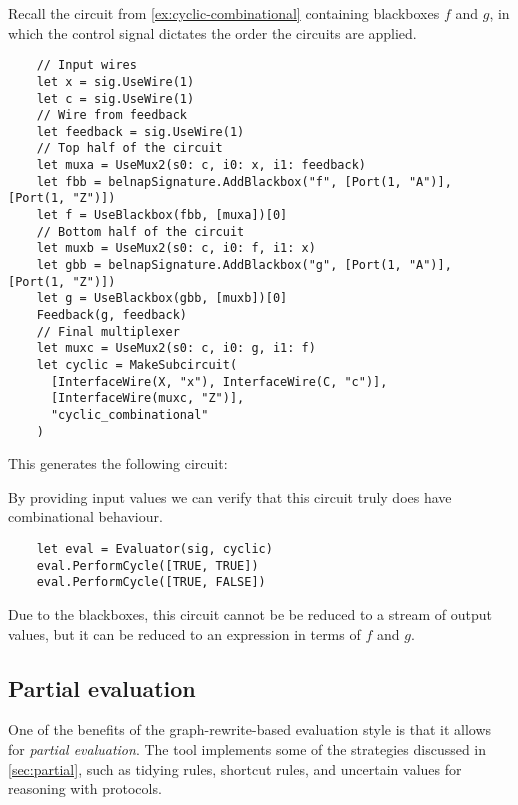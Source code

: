 \begin{example}
  Recall the circuit from \cref{ex:cyclic-combinational}
  containing blackboxes \(f\) and \(g\), in which the control signal
  dictates the order the circuits are applied.
  \begin{lstlisting}
    // Input wires
    let x = sig.UseWire(1)
    let c = sig.UseWire(1)
    // Wire from feedback
    let feedback = sig.UseWire(1)
    // Top half of the circuit
    let muxa = UseMux2(s0: c, i0: x, i1: feedback)
    let fbb = belnapSignature.AddBlackbox("f", [Port(1, "A")], [Port(1, "Z")])
    let f = UseBlackbox(fbb, [muxa])[0]
    // Bottom half of the circuit
    let muxb = UseMux2(s0: c, i0: f, i1: x)
    let gbb = belnapSignature.AddBlackbox("g", [Port(1, "A")], [Port(1, "Z")])
    let g = UseBlackbox(gbb, [muxb])[0]
    Feedback(g, feedback)
    // Final multiplexer
    let muxc = UseMux2(s0: c, i0: g, i1: f)
    let cyclic = MakeSubcircuit(
      [InterfaceWire(X, "x"), InterfaceWire(C, "c")],
      [InterfaceWire(muxc, "Z")],
      "cyclic_combinational"
    )
  \end{lstlisting}
  This generates the following circuit:
  \begin{center}
    
  \end{center}
  By providing input values we can verify that this circuit truly does have
  combinational behaviour.
  \begin{lstlisting}
    let eval = Evaluator(sig, cyclic)
    eval.PerformCycle([TRUE, TRUE])
    eval.PerformCycle([TRUE, FALSE])
  \end{lstlisting}
  Due to the blackboxes, this circuit cannot be be reduced to a stream of output
  values, but it can be reduced to an expression in terms of \(f\) and \(g\).
  \begin{center}
    
  \end{center}
\end{example}

\subsection{Partial evaluation}

One of the benefits of the graph-rewrite-based evaluation style is that it
allows for \emph{partial evaluation}.
The tool implements some of the strategies discussed in \cref{sec:partial}, such
as tidying rules, shortcut rules, and uncertain values for reasoning with
protocols.


